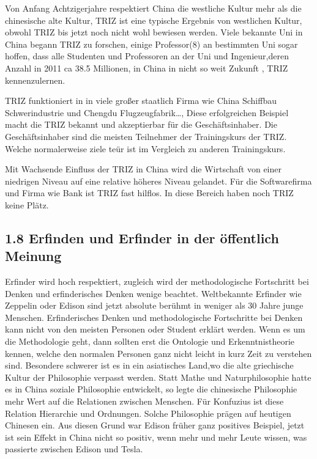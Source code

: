 \documentclass[11pt,a4paper]{article}
\begin{document}
Von Anfang Achtzigerjahre respektiert China die westliche Kultur mehr als die
chinesische alte Kultur, TRIZ ist eine typische Ergebnis von westlichen
Kultur, obwohl TRIZ bis jetzt noch nicht wohl bewiesen werden. Viele bekannte
Uni in China begann TRIZ zu forschen, einige Professor(8) an bestimmten Uni
sogar hoffen, dass alle Studenten und Professoren an der Uni und
Ingenieur,deren Anzahl in 2011 ca 38.5 Millionen, in China in nicht so weit
Zukunft , TRIZ kennenzulernen.  

TRIZ funktioniert in in viele großer staatlich Firma wie China Schiffbau
Schwerindustrie und Chengdu Flugzeugfabrik…, Diese erfolgreichen Beispiel
macht die TRIZ bekannt  und akzeptierbar  für die  Geschäftsinhaber.  Die
Geschäftsinhaber sind die meisten Teilnehmer der Trainingskurs der
TRIZ. Welche normalerweise ziele teür ist im Vergleich zu anderen
Trainingskurs. 

Mit Wachsende Einfluss der TRIZ in China wird die Wirtschaft von einer
niedrigen Niveau auf eine relative höheres Niveau gelandet. Für die
Softwarefirma und Firma wie Bank ist TRIZ fast hilflos. In diese Bereich haben
noch TRIZ keine Plätz. 

\subsection{1.8 Erfinden und Erfinder in der öffentlich Meinung}

Erfinder wird hoch respektiert, zugleich wird der methodologische Fortschritt
bei Denken und erfinderisches Denken wenige beachtet. Weltbekannte Erfinder
wie Zeppelin oder Edison sind jetzt absolute berühmt in weniger als 30 Jahre
junge Menschen. Erfinderisches Denken und methodologische Fortschritte bei
Denken kann nicht von den meisten Personen oder Student erklärt werden. Wenn
es um die Methodologie geht, dann sollten erst die Ontologie und
Erkenntnistheorie kennen, welche den normalen Personen ganz nicht leicht in
kurz Zeit zu verstehen sind. Besondere schwerer ist es in ein asiatisches
Land,wo die alte griechische Kultur der Philosophie verpasst werden. Statt
Mathe und Naturphilosophie hatte es in China soziale Philosophie entwickelt,
so legte die chinesische Philosophie mehr Wert auf die Relationen zwischen
Menschen. Für Konfuzius ist diese Relation Hierarchie und Ordnungen. Solche
Philosophie prägen auf heutigen Chinesen ein. Aus diesen Grund war Edison
früher ganz positives Beispiel, jetzt ist sein Effekt in China nicht so
positiv, wenn mehr und mehr Leute wissen, was passierte zwischen Edison und
Tesla.
\end{document}
